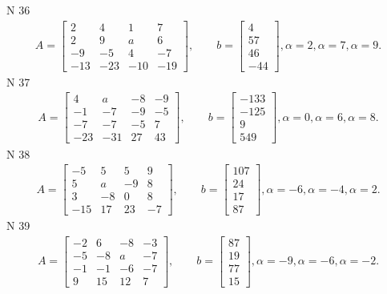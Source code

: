 \documentclass[11pt]{report}
\begin{document}
N 36
\begin{align*}
 A = \left[\begin{matrix}2 & 4 & 1 & 7\\2 & 9 & a & 6\\-9 & -5 & 4 & -7\\-13 & -23 & -10 & -19\end{matrix}\right],
    \qquad b = \left[\begin{matrix}4\\57\\46\\-44\end{matrix}\right], \alpha = 2, \alpha = 7, \alpha = 9. 
 \end{align*}
N 37
\begin{align*}
 A = \left[\begin{matrix}4 & a & -8 & -9\\-1 & -7 & -9 & -5\\-7 & -7 & -5 & 7\\-23 & -31 & 27 & 43\end{matrix}\right],
    \qquad b = \left[\begin{matrix}-133\\-125\\9\\549\end{matrix}\right], \alpha = 0, \alpha = 6, \alpha = 8. 
 \end{align*}
N 38
\begin{align*}
 A = \left[\begin{matrix}-5 & 5 & 5 & 9\\5 & a & -9 & 8\\3 & -8 & 0 & 8\\-15 & 17 & 23 & -7\end{matrix}\right],
    \qquad b = \left[\begin{matrix}107\\24\\17\\87\end{matrix}\right], \alpha = -6, \alpha = -4, \alpha = 2. 
 \end{align*}
N 39
\begin{align*}
 A = \left[\begin{matrix}-2 & 6 & -8 & -3\\-5 & -8 & a & -7\\-1 & -1 & -6 & -7\\9 & 15 & 12 & 7\end{matrix}\right],
    \qquad b = \left[\begin{matrix}87\\19\\77\\15\end{matrix}\right], \alpha = -9, \alpha = -6, \alpha = -2. 
 \end{align*}
\end{document}
